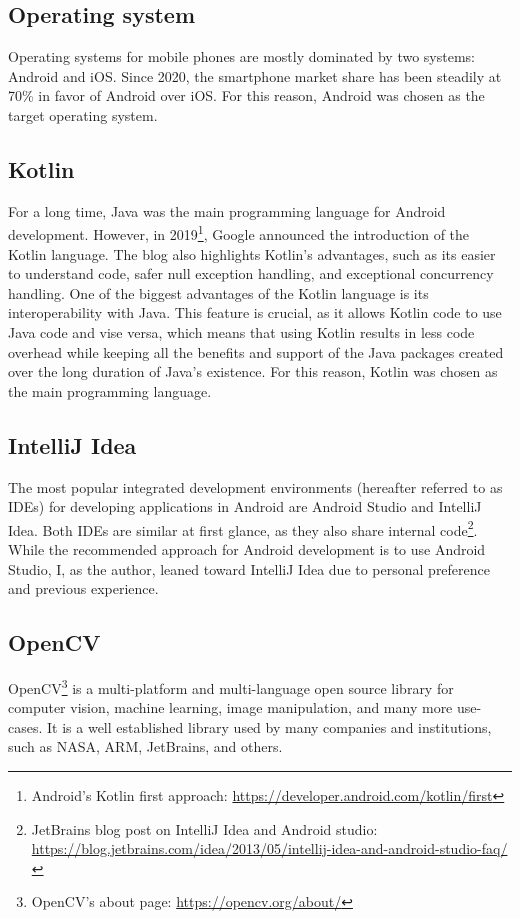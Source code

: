 \subsection{Operating system}
Operating systems for mobile phones are mostly dominated by two systems: Android and iOS. Since 2020, the smartphone market share has been steadily at 70\% \cite{phoneOsStatistics} in favor of Android over iOS. For this reason, Android was chosen as the target operating system.

\subsection{Kotlin}
For a long time, Java was the main programming language for Android development. However, in 2019\footnote{Android's Kotlin first approach: \url{https://developer.android.com/kotlin/first}}, Google announced the introduction of the Kotlin language. The blog also highlights Kotlin's advantages, such as its easier to understand code, safer null exception handling, and exceptional concurrency handling. One of the biggest advantages of the Kotlin language is its interoperability with Java. This feature is crucial, as it allows Kotlin code to use Java code and vise versa, which means that using Kotlin results in less code overhead while keeping all the benefits and support of the Java packages created over the long duration of Java's existence. For this reason, Kotlin was chosen as the main programming language.

\subsection{IntelliJ Idea}
The most popular integrated development environments (hereafter referred to as IDEs) for developing applications in Android are Android Studio and IntelliJ Idea. Both IDEs are similar at first glance, as they also share internal code\footnote{JetBrains blog post on IntelliJ Idea and Android studio: \url{https://blog.jetbrains.com/idea/2013/05/intellij-idea-and-android-studio-faq/}}. While the recommended approach for Android development is to use Android Studio, I, as the author, leaned toward IntelliJ Idea due to  personal preference and previous experience.

\subsection{OpenCV}
OpenCV\footnote{OpenCV's about page: \url{https://opencv.org/about/}} is a multi-platform and multi-language open source library for computer vision, machine learning, image manipulation, and many more use-cases. It is a well established library used by many companies and institutions, such as NASA, ARM, JetBrains, and others. 

